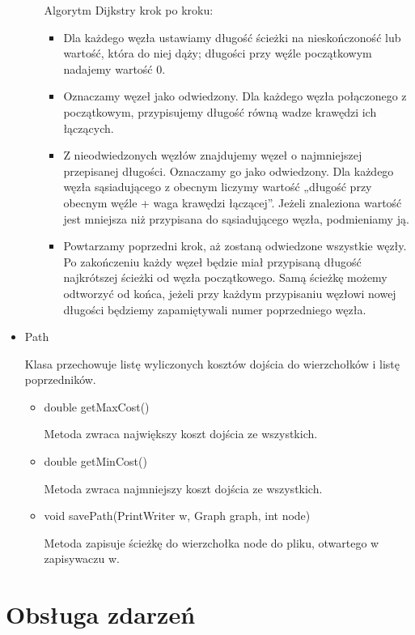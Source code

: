 \documentclass[]{article}
\begin{document}
\begin{itemize}
\begin{itemize}
        Algorytm Dijkstry krok po kroku:
        \begin{itemize}
            \item Dla każdego węzła ustawiamy długość ścieżki na nieskończoność lub wartość, która do niej dąży; długości przy węźle początkowym nadajemy wartość 0. 
            \item Oznaczamy węzeł jako odwiedzony. Dla każdego węzła połączonego z początkowym, przypisujemy długość równą wadze krawędzi ich łączących.
            \item Z nieodwiedzonych węzłów znajdujemy węzeł o najmniejszej przepisanej długości. Oznaczamy go jako odwiedzony. Dla każdego węzła sąsiadującego z obecnym liczymy wartość „długość przy obecnym węźle + waga krawędzi łączącej”. Jeżeli znaleziona wartość jest mniejsza niż przypisana do sąsiadującego węzła, podmieniamy ją.
            \item Powtarzamy poprzedni krok, aż zostaną odwiedzone wszystkie węzły. Po zakończeniu każdy węzeł będzie miał przypisaną długość najkrótszej ścieżki od węzła początkowego. Samą ścieżkę możemy odtworzyć od końca, jeżeli przy każdym przypisaniu węzłowi nowej długości będziemy zapamiętywali numer poprzedniego węzła.
        \end{itemize}
    \end{itemize}
    \item Path
  
    Klasa przechowuje listę wyliczonych kosztów dojścia do wierzchołków i listę poprzedników.
        \begin{itemize}
        \item double getMaxCost()
        
        Metoda zwraca największy koszt dojścia ze wszystkich.
        \item double getMinCost()
        
        Metoda zwraca najmniejszy koszt dojścia ze wszystkich.
        \item void savePath(PrintWriter w, Graph graph, int node)
        
        Metoda zapisuje ścieżkę do wierzchołka node do pliku, otwartego w zapisywaczu w.
    \end{itemize}
\end{itemize}

\section{Obsługa zdarzeń}\label{header-n279}
\end{document}
